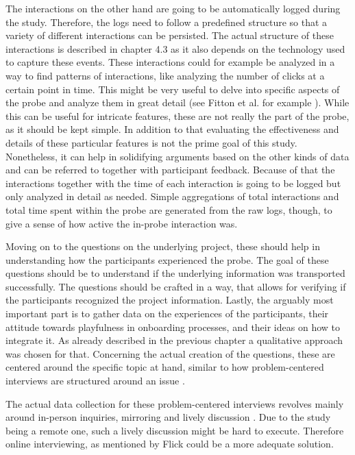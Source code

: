 The interactions on the other hand are going to be automatically logged during the study. Therefore, the logs need to follow a predefined structure so that a variety of different interactions can be persisted. The actual structure of these interactions is described in chapter 4.3 as it also depends on the technology used to capture these events. These interactions could for example be analyzed in a way to find patterns of interactions, like analyzing the number of clicks at a certain point in time. This might be very useful to delve into specific aspects of the probe and analyze them in great detail (see Fitton et al. for example \cite{fitton2004probing}). While this can be useful for intricate features, these are not really the part of the probe, as it should be kept simple. In addition to that evaluating the effectiveness and details of these particular features is not the prime goal of this study. Nonetheless, it can help in solidifying arguments based on the other kinds of data and can be referred to together with participant feedback. Because of that the interactions together with the time of each interaction is going to be logged but only analyzed in detail as needed. Simple aggregations of total interactions and total time spent within the probe are generated from the raw logs, though, to give a sense of how active the in-probe interaction was.

Moving on to the questions on the underlying project, these should help in understanding how the participants experienced the probe. The goal of these questions should be to understand if the underlying information was transported successfully. The questions should be crafted in a way, that allows for verifying if the participants recognized the project information. Lastly, the arguably most important part is to gather data on the experiences of the participants, their attitude towards playfulness in onboarding processes, and their ideas on how to integrate it. As already described in the previous chapter a qualitative approach was chosen for that. Concerning the actual creation of the questions, these are centered around the specific topic at hand, similar to how problem-centered interviews are structured around an issue \cite{witzel2012problem}.

The actual data collection for these problem-centered interviews revolves mainly around in-person inquiries, mirroring and lively discussion \cite[p. 232-236]{flick2018introduction}. Due to the study being a remote one, such a lively discussion might be hard to execute. Therefore online interviewing, as mentioned by Flick \cite[p. 243]{flick2018introduction} could be a more adequate solution.

